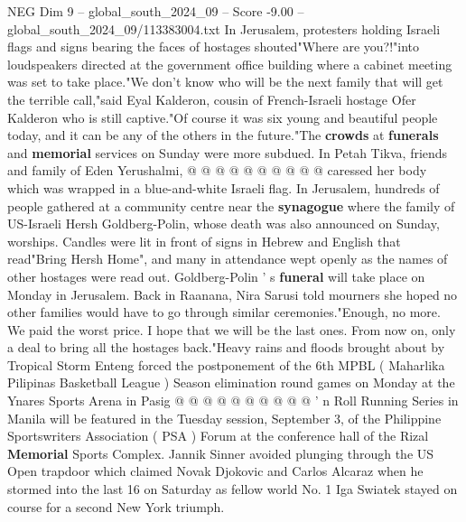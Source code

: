 \begin{textsample}{NEG Dim 9 – global\_south\_2024\_09 – Score -9.00 – global\_south\_2024\_09/113383004.txt}
In Jerusalem, protesters holding Israeli flags and signs bearing the faces of hostages shouted"Where are you?!"into loudspeakers directed at the government office building where a cabinet meeting was set to take place."We don't know who will be the next family that will get the terrible call,"said Eyal Kalderon, cousin of French-Israeli hostage Ofer Kalderon who is still captive."Of course it was six young and beautiful people today, and it can be any of the others in the future."The \textbf{crowds} at \textbf{funerals} and \textbf{memorial} services on Sunday were more subdued.
In Petah Tikva, friends and family of Eden Yerushalmi, @ @ @ @ @ @ @ @ @ @ caressed her body which was wrapped in a blue-and-white Israeli flag.
In Jerusalem, hundreds of people gathered at a community centre near the \textbf{synagogue} where the family of US-Israeli Hersh Goldberg-Polin, whose death was also announced on Sunday, worships.
Candles were lit in front of signs in Hebrew and English that read"Bring Hersh Home", and many in attendance wept openly as the names of other hostages were read out.
Goldberg-Polin ' s \textbf{funeral} will take place on Monday in Jerusalem.
Back in Raanana, Nira Sarusi told mourners she hoped no other families would have to go through similar ceremonies."Enough, no more.
We paid the worst price.
I hope that we will be the last ones.
From now on, only a deal to bring all the hostages back."Heavy rains and floods brought about by Tropical Storm Enteng forced the postponement of the 6th MPBL ( Maharlika Pilipinas Basketball League ) Season elimination round games on Monday at the Ynares Sports Arena in Pasig @ @ @ @ @ @ @ @ @ @ ' n Roll Running Series in Manila will be featured in the Tuesday session, September 3, of the Philippine Sportswriters Association ( PSA ) Forum at the conference hall of the Rizal \textbf{Memorial} Sports Complex.
Jannik Sinner avoided plunging through the US Open trapdoor which claimed Novak Djokovic and Carlos Alcaraz when he stormed into the last 16 on Saturday as fellow world No. 1 Iga Swiatek stayed on course for a second New York triumph.

\end{textsample}
